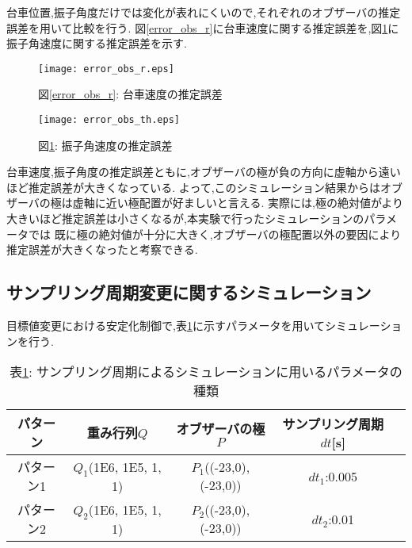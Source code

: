 台車位置,振子角度だけでは変化が表れにくいので,それぞれのオブザーバの推定誤差を用いて比較を行う.
図\ref{error_obs_r}に台車速度に関する推定誤差を,図\ref{error_obs_th}に振子角速度に関する推定誤差を示す.

\begin{figure}[htbp]
    \begin{minipage}{0.5\hsize}
        \begin{center}
            \texttt{[image: error\_obs\_r.eps]}
            \caption{図\ref{error_obs_r}: 台車速度の推定誤差}
            \label{error_obs_r}
        \end{center}
    \end{minipage}
    \begin{minipage}{0.5\hsize}
        \begin{center}
            \texttt{[image: error\_obs\_th.eps]}
            \caption{図\ref{error_obs_th}: 振子角速度の推定誤差}
            \label{error_obs_th}
        \end{center}
    \end{minipage}
\end{figure}

台車速度,振子角度の推定誤差ともに,オブザーバの極が負の方向に虚軸から遠いほど推定誤差が大きくなっている.
よって,このシミュレーション結果からはオブザーバの極は虚軸に近い極配置が好ましいと言える.
実際には,極の絶対値がより大きいほど推定誤差は小さくなるが,本実験で行ったシミュレーションのパラメータでは
既に極の絶対値が十分に大きく,オブザーバの極配置以外の要因により推定誤差が大きくなったと考察できる.


\subsection{サンプリング周期変更に関するシミュレーション}
目標値変更における安定化制御で,表\ref{sim_Dt}に示すパラメータを用いてシミュレーションを行う.

\begin{table}[htbp]
    \begin{center}
        \caption{表\ref{sim_Dt}: サンプリング周期によるシミュレーションに用いるパラメータの種類}
        \begin{tabular}{|c|c|c|c|c|} \hline
            パターン & 重み行列$Q$ & オブザーバの極$P$ & サンプリング周期$dt$[s] \\ \hline \hline
            パターン1 & $Q_1$(1E6, 1E5, 1, 1) & $P_1$((-23,0), (-23,0)) & $dt_1$:0.005 \\ \hline
            パターン2 & $Q_2$(1E6, 1E5, 1, 1) & $P_2$((-23,0), (-23,0)) & $dt_2$:0.01 \\ \hline
        \end{tabular}
        \label{sim_Dt}
    \end{center}
\end{table}

